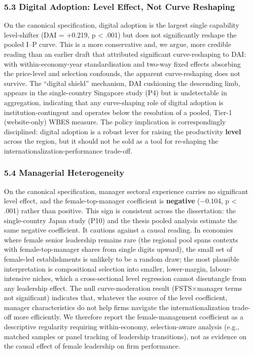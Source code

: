 \documentclass[
  12pt,a4paper]{article}
\begin{document}
\hypertarget{digital-adoption-level-effect-not-curve-reshaping}{%
\subsubsection{5.3 Digital Adoption: Level Effect, Not Curve
Reshaping}\label{digital-adoption-level-effect-not-curve-reshaping}}

On the canonical specification, digital adoption is the largest single
capability level-shifter (DAI = +0.219, p \textless{} .001) but does not
significantly reshape the pooled I--P curve. This is a more conservative
and, we argue, more credible reading than an earlier draft that
attributed significant curve-reshaping to DAI: with within-economy-year
standardisation and two-way fixed effects absorbing the price-level and
selection confounds, the apparent curve-reshaping does not survive. The
``digital shield'' mechanism, DAI cushioning the descending limb,
appears in the single-country Singapore study (P4) but is undetectable
in aggregation, indicating that any curve-shaping role of digital
adoption is institution-contingent and operates below the resolution of
a pooled, Tier-1 (website-only) WBES measure. The policy implication is
correspondingly disciplined: digital adoption is a robust lever for
raising the productivity \textbf{level} across the region, but it should
not be sold as a tool for re-shaping the
internationalization-performance trade-off.

\hypertarget{managerial-heterogeneity}{%
\subsubsection{5.4 Managerial
Heterogeneity}\label{managerial-heterogeneity}}

On the canonical specification, manager sectoral experience carries no
significant level effect, and the female-top-manager coefficient is
\textbf{negative} (−0.104, p \textless{} .001) rather than positive.
This sign is consistent across the dissertation: the single-country
Japan study (P10) and the thesis pooled analysis estimate the same
negative coefficient. It cautions against a causal reading. In economies
where female senior leadership remains rare (the regional pool spans
contexts with female-top-manager shares from single digits upward), the
small set of female-led establishments is unlikely to be a random draw;
the most plausible interpretation is compositional selection into
smaller, lower-margin, labour-intensive niches, which a cross-sectional
level regression cannot disentangle from any leadership effect. The null
curve-moderation result (FSTS×manager terms not significant) indicates
that, whatever the source of the level coefficient, manager
characteristics do not help firms navigate the internationalization
trade-off more efficiently. We therefore report the female-management
coefficient as a descriptive regularity requiring within-economy,
selection-aware analysis (e.g., matched samples or panel tracking of
leadership transitions), not as evidence on the causal effect of female
leadership on firm performance.
\end{document}
